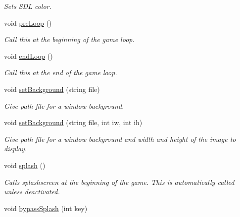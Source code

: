\begin{DoxyCompactItemize}
\begin{DoxyCompactList}\small\item\em Sets S\+DL color. \end{DoxyCompactList}\item 
void \hyperlink{classEngine_a0797e5b8fef41b25bc317fd4290b07a6}{pre\+Loop} ()\hypertarget{classEngine_a0797e5b8fef41b25bc317fd4290b07a6}{}\label{classEngine_a0797e5b8fef41b25bc317fd4290b07a6}

\begin{DoxyCompactList}\small\item\em Call this at the beginning of the game loop. \end{DoxyCompactList}\item 
void \hyperlink{classEngine_a998a6def6ff478e817c6633e8d1b56f3}{end\+Loop} ()\hypertarget{classEngine_a998a6def6ff478e817c6633e8d1b56f3}{}\label{classEngine_a998a6def6ff478e817c6633e8d1b56f3}

\begin{DoxyCompactList}\small\item\em Call this at the end of the game loop. \end{DoxyCompactList}\item 
void \hyperlink{classEngine_a671bd48802debd6c16638de60d32375d}{set\+Background} (string file)\hypertarget{classEngine_a671bd48802debd6c16638de60d32375d}{}\label{classEngine_a671bd48802debd6c16638de60d32375d}

\begin{DoxyCompactList}\small\item\em Give path file for a window background. \end{DoxyCompactList}\item 
void \hyperlink{classEngine_a3b29642732b85dc1b63e9a69efd97677}{set\+Background} (string file, int iw, int ih)\hypertarget{classEngine_a3b29642732b85dc1b63e9a69efd97677}{}\label{classEngine_a3b29642732b85dc1b63e9a69efd97677}

\begin{DoxyCompactList}\small\item\em Give path file for a window background and width and height of the image to display. \end{DoxyCompactList}\item 
void \hyperlink{classEngine_adb6f1426c5c57f9d60be1e10d8eb2506}{splash} ()\hypertarget{classEngine_adb6f1426c5c57f9d60be1e10d8eb2506}{}\label{classEngine_adb6f1426c5c57f9d60be1e10d8eb2506}

\begin{DoxyCompactList}\small\item\em Calls splashscreen at the beginning of the game. This is automatically called unless deactivated. \end{DoxyCompactList}\item 
void \hyperlink{classEngine_a3b9cf8a050f43e4e185748f7b2a3ded8}{bypass\+Splash} (int key)\hypertarget{classEngine_a3b9cf8a050f43e4e185748f7b2a3ded8}{}\label{classEngine_a3b9cf8a050f43e4e185748f7b2a3ded8}


\end{DoxyCompactItemize}
